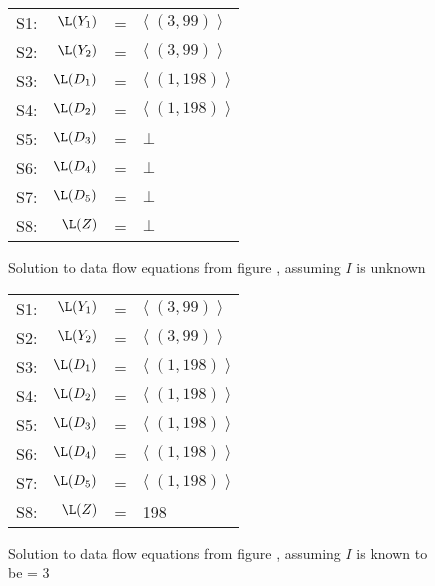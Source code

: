 \begin{figure}
\begin{center}
\begin{tabular}{r r c l}
\mbox{S1:} & $\L(Y_1)$ & = & $\langle \; (3,99)\; \rangle$ \\
\mbox{S2:} & $\L(Y_2)$ & = & $\langle \; (3,99)\; \rangle$ \\
\mbox{S3:} & $\L(D_1)$ & = & $\langle \; (1,198)\; \rangle$ \\
\mbox{S4:} & $\L(D_2)$ & = & $\langle \; (1,198)\; \rangle$ \\
\mbox{S5:} & $\L(D_3)$ & = & $\bot$\\
\mbox{S6:} & $\L(D_4)$ & = & $\bot$\\
\mbox{S7:} & $\L(D_5)$ & = & $\bot$\\
\mbox{S8:} & $\L(Z)$ & =  & $\bot$
\end{tabular}
\end{center}
\caption{Solution to data flow equations from figure \protect{\ref{fig:sc-ex-df}}, assuming $I$ is unknown}
\label{fig:sc-ex-sol1}
\end{figure}

\begin{figure}
\begin{center}
\begin{tabular}{r r c l}
\mbox{S1:} & $\L(Y_1)$ & = & $\langle \; (3,99)\; \rangle$ \\
\mbox{S2:} & $\L(Y_2)$ & = & $\langle \; (3,99)\; \rangle$ \\
\mbox{S3:} & $\L(D_1)$ & = & $\langle \; (1,198)\; \rangle$ \\
\mbox{S4:} & $\L(D_2)$ & = & $\langle \; (1,198)\; \rangle$ \\
\mbox{S5:} & $\L(D_3)$ & = & $\langle \; (1,198)\; \rangle$ \\
\mbox{S6:} & $\L(D_4)$ & = & $\langle \; (1,198)\; \rangle$ \\
\mbox{S7:} & $\L(D_5)$ & = & $\langle \; (1,198)\; \rangle$ \\
\mbox{S8:} & $\L(Z)$ & =  & 198
\end{tabular}
\end{center}
\caption{Solution to data flow equations from figure \protect{\ref{fig:sc-ex-df}}, assuming $I$ is known to be = 3}
\label{fig:sc-ex-sol2}
\end{figure}
